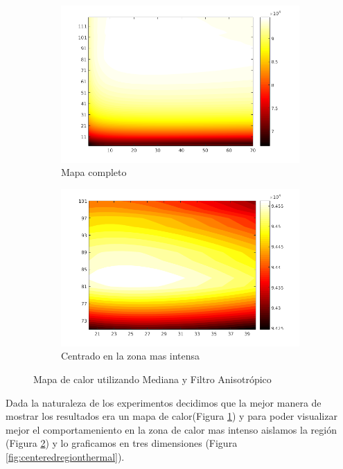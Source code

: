 \begin{figure}[H]
	\centering
	\begin{subfigure}[b]{0.48\textwidth}
        \includegraphics[width=1\textwidth]{./Figures/AllDataThermalAnisodiff.png}
        \caption{Mapa completo}
        \label{fig:thermalforanisodiffwithmediana}
  \end{subfigure}
  \begin{subfigure}[b]{0.48\textwidth}
        \includegraphics[width=1\textwidth]{./Figures/CenteredThermalAnisodiff.png}
        \caption{Centrado en la zona mas intensa}
        \label{fig:thermalforanisodiffwithmedianacentered}
  \end{subfigure}
	\label{fig:thermalfigure}
	\caption{Mapa de calor utilizando Mediana y Filtro Anisotr\'opico}
\end{figure}

Dada la naturaleza de los experimentos decidimos que la mejor manera de mostrar los resultados era un mapa de calor(Figura \ref{fig:thermalforanisodiffwithmediana}) y para poder visualizar mejor el comportameniento en la zona de calor mas intenso aislamos la regi\'on (Figura \ref{fig:thermalforanisodiffwithmedianacentered}) y lo graficamos en tres dimensiones (Figura \ref{fig:centeredregionthermal}).

